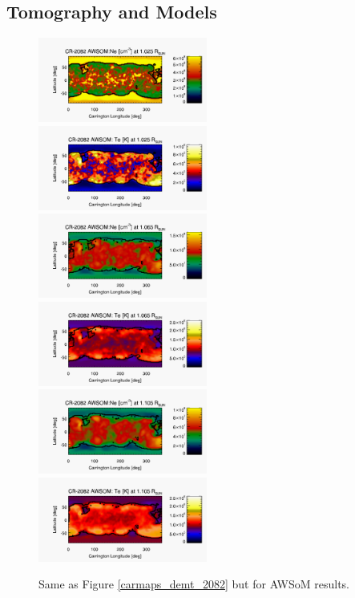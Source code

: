 \documentclass[namedreferences]{solarphysics}
\begin{document}
\begin{article}
\subsection{Tomography and Models}\label{awsom_res} 

\begin{figure}%
\begin{center}
\includegraphics[width=0.495\textwidth]{figs/map_Ne_awsom_2082_185_short_1025_Rsun.pdf}
\includegraphics[width=0.495\textwidth]{figs/map_Te_awsom_2082_185_short_1025_Rsun.pdf}
\includegraphics[width=0.495\textwidth]{figs/map_Ne_awsom_2082_185_short_1065_Rsun.pdf}
\includegraphics[width=0.495\textwidth]{figs/map_Te_awsom_2082_185_short_1065_Rsun.pdf}
\includegraphics[width=0.495\textwidth]{figs/map_Ne_awsom_2082_185_short_1105_Rsun.pdf}
\includegraphics[width=0.495\textwidth]{figs/map_Te_awsom_2082_185_short_1105_Rsun.pdf}
\caption{Same as Figure \ref{carmaps_demt_2082} but for AWSoM results.}
\label{carmaps_awsom_2082}
\end{center}
\end{figure}


\end{article}
\end{document}
